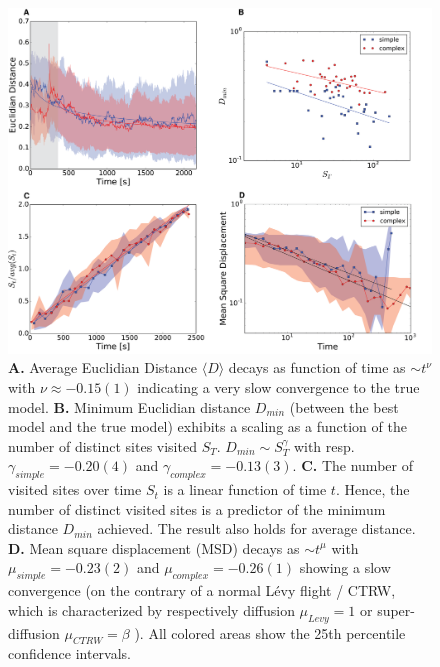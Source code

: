 \begin{figure}[h!]
\begin{center}
\includegraphics[width=16cm]{figures/Dmin_vs_St.png}
\caption{{\bf A.} Average Euclidian Distance $\langle D \rangle$ decays as function of time as $\sim t^{\nu}$ with $ \nu \approx -0.15(1)$ indicating a very slow convergence to the true model. {\bf B.} Minimum Euclidian distance $D_{min}$ (between the best model and the true model) exhibits a scaling as a function of the number of distinct sites visited $S_{T}$. $D_{min} \sim S_{T}^{\gamma}$ with resp. $\gamma_{simple} = -0.20(4)$ and $\gamma_{complex} = - 0.13(3)$. {\bf C.} The number of visited sites over time $S_t$ is a linear function of time $t$. Hence, the number of distinct visited sites is a predictor of the minimum distance $D_{min}$ achieved. The result also holds for average distance. {\bf D.} Mean square displacement (MSD) decays as $\sim t^{\mu}$ with $\mu_{simple} =-0.23(2)$ and $\mu_{complex} =- 0.26(1)$ showing a slow convergence (on the contrary of a normal L\'evy flight / CTRW, which is characterized by respectively diffusion $\mu_{Levy} = 1$ or super-diffusion $\mu_{CTRW} = \beta$ \cite{21,23}). All colored areas show the 25th percentile confidence intervals.}
\label{fig:Dmin_vs_St}
\end{center}
\end{figure}



